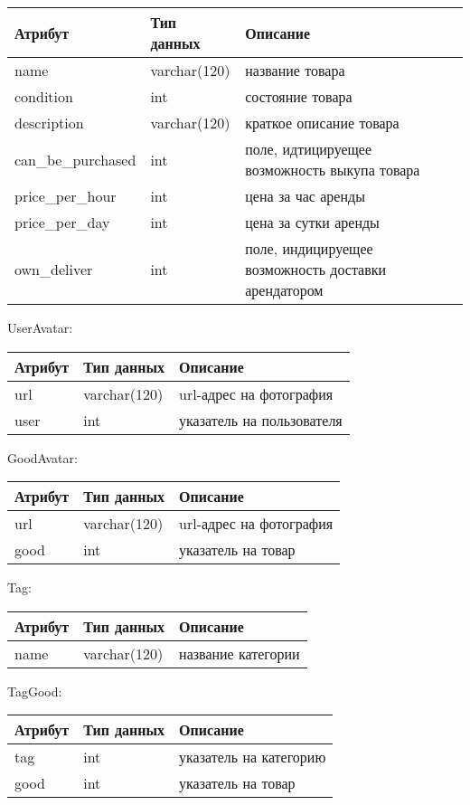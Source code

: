 \begin{tabular}{ | l | l | p{6cm} | }
    \hline
    Атрибут & Тип данных & Описание  \\ \hline
    name & varchar(120) & название товара \\ \hline
    condition & int & состояние товара \\ \hline
    description & varchar(120) & краткое описание товара \\ \hline
    can\_be\_purchased & int & поле, идтицируещее возможность выкупа товара \\ \hline
    price\_per\_hour & int & цена за час аренды \\ \hline
    price\_per\_day & int & цена за сутки аренды \\ \hline
    own\_deliver & int & поле, индицируещее возможность доставки арендатором\\
    \hline
\end{tabular}

UserAvatar:

\begin{tabular}{ | l | l | l | }
    \hline
    Атрибут & Тип данных & Описание  \\ \hline
    url & varchar(120) & url-адрес на фотография \\ \hline
    user & int & указатель на пользователя \\
    \hline
\end{tabular}

GoodAvatar:

\begin{tabular}{ | l | l | l | }
    \hline
    Атрибут & Тип данных & Описание  \\ \hline
    url & varchar(120) & url-адрес на фотография \\ \hline
    good & int & указатель на товар \\
    \hline
\end{tabular}

Tag:

\begin{tabular}{ | l | l | l | }
    \hline
    Атрибут & Тип данных & Описание  \\ \hline
    name & varchar(120) & название категории \\
    \hline
\end{tabular}

TagGood:

\begin{tabular}{ | l | l | l | }
    \hline
    Атрибут & Тип данных & Описание  \\ \hline
    tag & int & указатель на категорию \\ \hline
    good & int & указатель на товар \\
    \hline
\end{tabular}

